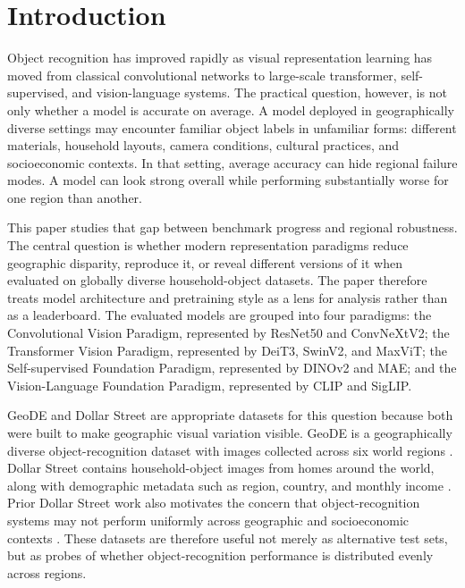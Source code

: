 \section{Introduction}

Object recognition has improved rapidly as visual representation learning has moved from classical convolutional networks to large-scale transformer, self-supervised, and vision-language systems. The practical question, however, is not only whether a model is accurate on average. A model deployed in geographically diverse settings may encounter familiar object labels in unfamiliar forms: different materials, household layouts, camera conditions, cultural practices, and socioeconomic contexts. In that setting, average accuracy can hide regional failure modes. A model can look strong overall while performing substantially worse for one region than another.

This paper studies that gap between benchmark progress and regional robustness. The central question is whether modern representation paradigms reduce geographic disparity, reproduce it, or reveal different versions of it when evaluated on globally diverse household-object datasets. The paper therefore treats model architecture and pretraining style as a lens for analysis rather than as a leaderboard. The evaluated models are grouped into four paradigms: the Convolutional Vision Paradigm, represented by ResNet50 and ConvNeXtV2; the Transformer Vision Paradigm, represented by DeiT3, SwinV2, and MaxViT; the Self-supervised Foundation Paradigm, represented by DINOv2 and MAE; and the Vision-Language Foundation Paradigm, represented by CLIP and SigLIP.

GeoDE and Dollar Street are appropriate datasets for this question because both were built to make geographic visual variation visible. GeoDE is a geographically diverse object-recognition dataset with images collected across six world regions \citep{ramaswamy2023geode}. Dollar Street contains household-object images from homes around the world, along with demographic metadata such as region, country, and monthly income \citep{rojas2022dollarstreet}. Prior Dollar Street work also motivates the concern that object-recognition systems may not perform uniformly across geographic and socioeconomic contexts \citep{devries2019object}. These datasets are therefore useful not merely as alternative test sets, but as probes of whether object-recognition performance is distributed evenly across regions.

